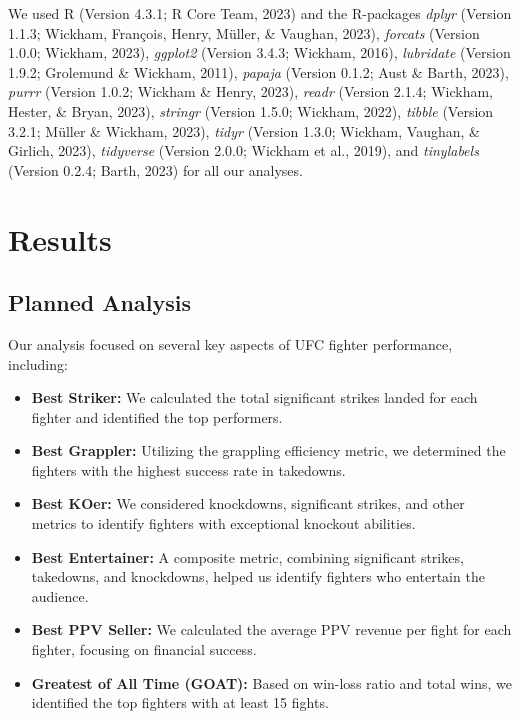 \documentclass[
  man,floatsintext]{apa6}
\begin{document}
We used R (Version 4.3.1; R Core Team, 2023) and the R-packages \emph{dplyr} (Version 1.1.3; Wickham, François, Henry, Müller, \& Vaughan, 2023), \emph{forcats} (Version 1.0.0; Wickham, 2023), \emph{ggplot2} (Version 3.4.3; Wickham, 2016), \emph{lubridate} (Version 1.9.2; Grolemund \& Wickham, 2011), \emph{papaja} (Version 0.1.2; Aust \& Barth, 2023), \emph{purrr} (Version 1.0.2; Wickham \& Henry, 2023), \emph{readr} (Version 2.1.4; Wickham, Hester, \& Bryan, 2023), \emph{stringr} (Version 1.5.0; Wickham, 2022), \emph{tibble} (Version 3.2.1; Müller \& Wickham, 2023), \emph{tidyr} (Version 1.3.0; Wickham, Vaughan, \& Girlich, 2023), \emph{tidyverse} (Version 2.0.0; Wickham et al., 2019), and \emph{tinylabels} (Version 0.2.4; Barth, 2023) for all our analyses.

\hypertarget{results}{%
\section{Results}\label{results}}

\hypertarget{planned-analysis}{%
\subsection{Planned Analysis}\label{planned-analysis}}

Our analysis focused on several key aspects of UFC fighter performance, including:

\begin{itemize}
\item
  \textbf{Best Striker:} We calculated the total significant strikes landed for each fighter and identified the top performers.
\item
  \textbf{Best Grappler:} Utilizing the grappling efficiency metric, we determined the fighters with the highest success rate in takedowns.
\item
  \textbf{Best KOer:} We considered knockdowns, significant strikes, and other metrics to identify fighters with exceptional knockout abilities.
\item
  \textbf{Best Entertainer:} A composite metric, combining significant strikes, takedowns, and knockdowns, helped us identify fighters who entertain the audience.
\item
  \textbf{Best PPV Seller:} We calculated the average PPV revenue per fight for each fighter, focusing on financial success.
\item
  \textbf{Greatest of All Time (GOAT):} Based on win-loss ratio and total wins, we identified the top fighters with at least 15 fights.
\end{itemize}
\end{document}
